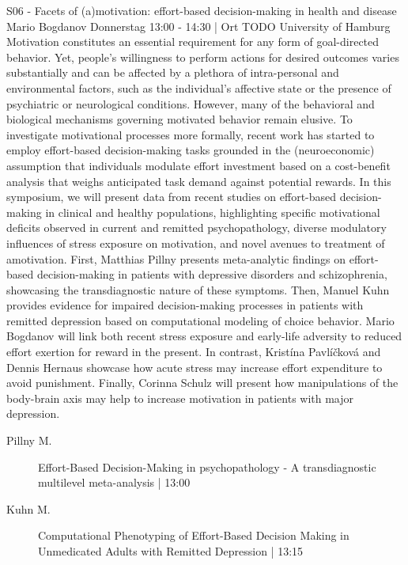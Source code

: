 
            \begin{symposium}
            {S06 - Facets of (a)motivation: effort-based decision-making in health and disease }
            {Mario Bogdanov}
            {Donnerstag 13:00 - 14:30 | Ort TODO}
            {University of Hamburg}
            Motivation constitutes an essential requirement for any form of goal-directed behavior. Yet, people’s willingness to perform actions for desired outcomes varies substantially and can be affected by a plethora of intra-personal and environmental factors, such as the individual’s affective state or the presence of psychiatric or neurological conditions. However, many of the behavioral and biological mechanisms governing motivated behavior remain elusive. To investigate motivational processes more formally, recent work has started to employ effort-based decision-making tasks grounded in the (neuroeconomic) assumption that individuals modulate effort investment based on a cost-benefit analysis that weighs anticipated task demand against potential rewards. In this symposium, we will present data from recent studies on effort-based decision-making in clinical and healthy populations, highlighting specific motivational deficits observed in current and remitted psychopathology, diverse modulatory influences of stress exposure on motivation, and novel avenues to treatment of amotivation. First, Matthias Pillny presents meta-analytic findings on effort-based decision-making in patients with depressive disorders and schizophrenia, showcasing the transdiagnostic nature of these symptoms. Then, Manuel Kuhn provides evidence for impaired decision-making processes in patients with remitted depression based on computational modeling of choice behavior. Mario Bogdanov will link both recent stress exposure and early-life adversity to reduced effort exertion for reward in the present. In contrast, Kristína Pavlíčková and Dennis Hernaus showcase how acute stress may increase effort expenditure to avoid punishment. Finally, Corinna Schulz will present how manipulations of the body-brain axis may help to increase motivation in patients with major depression.
            \begin{description}    
            
                \item [ Pillny M.] Effort-Based Decision-Making in psychopathology - A transdiagnostic multilevel meta-analysis \textcolor{mygray}{ | 13:00}    
                
                \item [ Kuhn M.] Computational Phenotyping of Effort-Based Decision Making in Unmedicated Adults with Remitted Depression \textcolor{mygray}{ | 13:15}    
                

\end{description}
\end{symposium}
